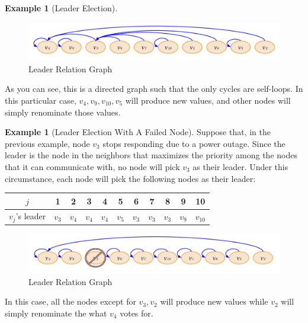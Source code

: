 \documentclass[12pt, psamsfonts]{amsart}
\theoremstyle{definition}
\newtheorem{exmp}[thm]{Example}
\theoremstyle{remark}
\numberwithin{equation}{subsection}
\begin{document}
\begin{exmp}[Leader Election]
    \begin{figure}[!htb]
        \includegraphics[width=.8\linewidth]{img/leader_election.jpeg}
        \caption{Leader Relation Graph}
        \label{fig:leader_relation}
    \end{figure}

    As you can see, this is a directed graph such that the only cycles are self-loops.
    In this particular case, $v_4, v_9, v_{10}, v_5$ will produce new values, and other nodes will simply renominate those values.
\end{exmp}

\begin{exmp}[Leader Election With A Failed Node]
    Suppose that, in the previous example, node $v_3$ stops responding due to a power outage.
    Since the leader is the node in the neighbors that maximizes the priority among the nodes that it can communicate with, no node will pick $v_3$ as their leader.
    Under this circumstance, each node will pick the following nodes as their leader:

    \begin{center}
      \begin{tabular}{ | c | c | c | c | c | c | c | c | c | c | c | }
        \hline
            $j$ & 1 & 2 & 3 & 4 & 5 & 6 & 7 & 8 & 9 & 10 \\ \hline
            $v_j$'s leader & $v_3$ & $v_4$ & $v_4$ & $v_4$ & $v_5$ & $v_3$ & $v_3$ & $v_3$ & $v_9$ & $v_{10}$ \\
        \hline
      \end{tabular}
    \end{center}

    \begin{figure}[!htb]
        \includegraphics[width=.8\linewidth]{img/leader_election_with_failed_node.jpeg}
        \caption{Leader Relation Graph}
        \label{fig:leader_relation_with_failed_node}
    \end{figure}
    
    In this case, all the nodes except for $v_3, v_2$ will produce new values while $v_2$ will simply renominate the what $v_4$ votes for.
\end{exmp}
\end{document}
